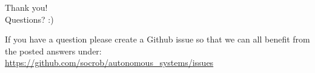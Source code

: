 \documentclass{beamer}
\begin{document}

%	
%	


%	
%	


%	
%	


\begin{frame}
\begin{LARGE}
\begin{center}
Thank you!\\

Questions? :)\\

\vspace*{1cm}

\footnotesize
If you have a question please create a Github issue so that we can all benefit from the posted answers under:
\\
\url{https://github.com/socrob/autonomous\_systems/issues}

\vspace*{2cm}
\end{center}
\end{LARGE}
\end{frame}

\end{document}
